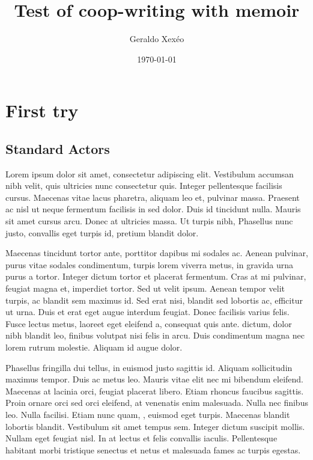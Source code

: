 \documentclass[12pt,a4paper]{memoir}
\author{Geraldo Xexéo}
\date{\today}
\title{Test of coop-writing with memoir}
\begin{document}
\maketitle
\chapter{First try}
\section{Standard Actors}

Lorem ipsum dolor sit amet, consectetur adipiscing elit. Vestibulum accumsan nibh velit, quis ultricies nunc consectetur quis. Integer pellentesque facilisis cursus. Maecenas vitae lacus pharetra, aliquam leo et, pulvinar massa. Praesent ac nisl ut neque fermentum facilisis in sed dolor. Duis id tincidunt nulla. Mauris sit amet cursus arcu. Donec at ultricies massa. Ut turpis nibh,  Phasellus nunc justo, convallis eget turpis id, pretium blandit dolor.

Maecenas tincidunt tortor ante, porttitor dapibus mi sodales ac. Aenean pulvinar, purus vitae sodales condimentum, turpis lorem viverra metus, in gravida urna purus a tortor. Integer dictum tortor et placerat fermentum. Cras at mi pulvinar, feugiat magna et, imperdiet tortor. Sed ut velit ipsum. Aenean tempor velit turpis, ac blandit sem maximus id. Sed erat nisi, blandit sed lobortis ac, efficitur ut urna. Duis et erat eget augue interdum feugiat. Donec facilisis varius felis. Fusce lectus metus, laoreet eget eleifend a, consequat quis ante.  dictum, dolor nibh blandit leo, finibus volutpat nisi felis in arcu. Duis condimentum magna nec lorem rutrum molestie. Aliquam id augue dolor.

Phasellus fringilla dui tellus, in euismod justo sagittis id. Aliquam sollicitudin maximus tempor. Duis ac metus leo. Mauris vitae elit nec mi bibendum eleifend. Maecenas at lacinia orci, feugiat placerat libero. Etiam rhoncus faucibus sagittis. Proin ornare orci sed orci eleifend, at venenatis enim malesuada. Nulla nec finibus leo. Nulla facilisi. Etiam nunc quam, , euismod eget turpis. Maecenas blandit lobortis blandit. Vestibulum sit amet tempus sem. Integer dictum suscipit mollis. Nullam eget feugiat nisl. In at lectus et felis convallis iaculis. Pellentesque habitant morbi tristique senectus et netus et malesuada fames ac turpis egestas.
\end{document}
